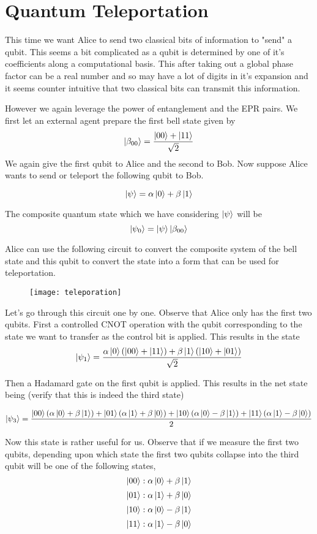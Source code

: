 \section{Quantum Teleportation}

This time we want Alice to send two classical bits of information to "send" a qubit. This seems a bit complicated as a qubit is determined by one of it's coefficients along a computational basis. This after taking out a global phase factor can be a real number and so may have a lot of digits in it's expansion and it seems counter intuitive that two classical bits can transmit this information.

However we again leverage the power of entanglement and the EPR pairs. We first let an external agent prepare the first bell state given by
$$ \ket{\beta_{00}} = \frac{\ket{00} + \ket{11}}{\sqrt{2}}$$
We again give the first qubit to Alice and the second to Bob. Now suppose Alice wants to send or teleport the following qubit to Bob.

$$ \ket{\psi} = \alpha\ket{0} + \beta\ket{1}$$

The composite quantum state which we have considering $\ket{\psi}$ will be $$\ket{\psi_{0}} = \ket{\psi}\ket{\beta_{00}}$$

Alice can use the following circuit to convert the composite system of the bell state and this qubit to convert the state into a form that can be used for teleportation. 
\begin{figure}[htp]
    \texttt{[image: teleporation]}
\end{figure}

Let's go through this circuit one by one. Observe that Alice only has the first two qubits. First a controlled CNOT operation with the qubit corresponding to the state we want to transfer as the control bit is applied.
This results in the state 
$$ \ket{\psi_1} = \frac{\alpha\ket{0}(\ket{00} + \ket{11}) + \beta\ket{1}(\ket{10} + \ket{01})}{\sqrt{2}}$$

Then a Hadamard gate on the first qubit is applied. This results in the net state being (verify that this is indeed the third state)

$$ \ket{\psi_3} = \frac{\ket{00}(\alpha\ket{0} + \beta\ket{1}) + \ket{01}(\alpha\ket{1} + \beta\ket{0}) + \ket{10}(\alpha\ket{0} - \beta\ket{1}) + \ket{11}(\alpha\ket{1} - \beta\ket{0})}{2}$$

Now this state is rather useful for us. Observe that if we measure the first two qubits, depending upon which state the first two qubits collapse into the third qubit will be one of the following states,
$$ \ket{00} : \alpha\ket{0} + \beta\ket{1}$$
$$ \ket{01} : \alpha\ket{1} + \beta\ket{0}$$
$$ \ket{10} : \alpha\ket{0} - \beta\ket{1}$$
$$ \ket{11} : \alpha\ket{1} - \beta\ket{0}$$

